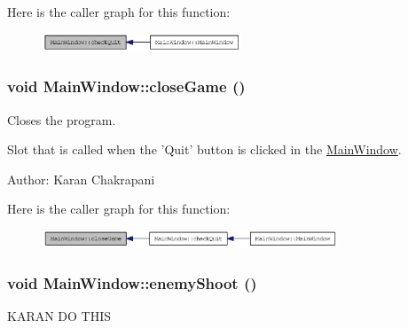 Here is the caller graph for this function:\nopagebreak
\begin{figure}[H]
\begin{center}
\leavevmode
\includegraphics[width=168pt]{class_main_window_af5fe3a1a1b28d5a77f91ffb2ca755dc9_icgraph}
\end{center}
\end{figure}
\hypertarget{class_main_window_a57a17b24a0c1a25ea3f2575febfa2daa}{
\subsubsection[{closeGame}]{\setlength{\rightskip}{0pt plus 5cm}void MainWindow::closeGame ()}}
\label{class_main_window_a57a17b24a0c1a25ea3f2575febfa2daa}
Closes the program.

Slot that is called when the 'Quit' button is clicked in the \hyperlink{class_main_window}{MainWindow}.

Author: Karan Chakrapani 

Here is the caller graph for this function:\nopagebreak
\begin{figure}[H]
\begin{center}
\leavevmode
\includegraphics[width=250pt]{class_main_window_a57a17b24a0c1a25ea3f2575febfa2daa_icgraph}
\end{center}
\end{figure}
\hypertarget{class_main_window_ac609f6dbbde76c9bc720a36aac05b633}{
\subsubsection[{enemyShoot}]{\setlength{\rightskip}{0pt plus 5cm}void MainWindow::enemyShoot ()}}
\label{class_main_window_ac609f6dbbde76c9bc720a36aac05b633}
KARAN DO THIS 

